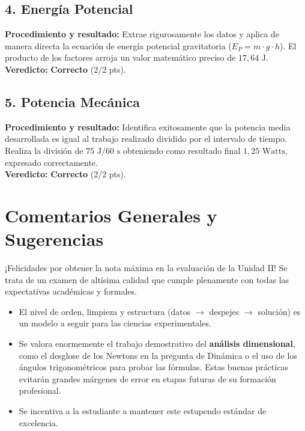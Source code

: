 \documentclass[12pt,letterpaper]{article}
\begin{document}
\subsection*{4. Energía Potencial}
\textbf{Procedimiento y resultado:} Extrae rigurosamente los datos y aplica de manera directa la ecuación de energía potencial gravitatoria ($E_P = m \cdot g \cdot h$). El producto de los factores arroja un valor matemático preciso de $17,64 \text{ J}$. \\
\textbf{Veredicto:} \textbf{Correcto} (2/2 pts).

\subsection*{5. Potencia Mecánica}
\textbf{Procedimiento y resultado:} Identifica exitosamente que la potencia media desarrollada es igual al trabajo realizado dividido por el intervalo de tiempo. Realiza la división de $75 \text{ J} / 60 \text{ s}$ obteniendo como resultado final $1,25 \text{ Watts}$, expresado correctamente. \\
\textbf{Veredicto:} \textbf{Correcto} (2/2 pts).

\vspace{0.5cm}
\section*{Comentarios Generales y Sugerencias}
¡Felicidades por obtener la nota máxima en la evaluación de la Unidad II! Se trata de un examen de altísima calidad que cumple plenamente con todas las expectativas académicas y formales.
\begin{itemize}
    \item El nivel de orden, limpieza y estructura (datos $\rightarrow$ despejes $\rightarrow$ solución) es un modelo a seguir para las ciencias experimentales.
    \item Se valora enormemente el trabajo demostrativo del \textbf{análisis dimensional}, como el desglose de los Newtons en la pregunta de Dinámica o el uso de los ángulos trigonométricos para probar las fórmulas. Estas buenas prácticas evitarán grandes márgenes de error en etapas futuras de su formación profesional.
    \item Se incentiva a la estudiante a mantener este estupendo estándar de excelencia.
\end{itemize}
\end{document}
